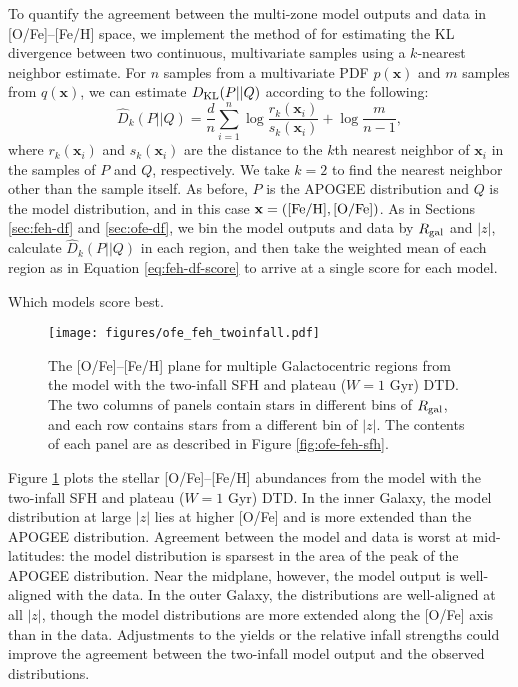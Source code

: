 \documentclass[twocolumn,twocolappendix,linenumbers]{aastex631}
\newcommand{\todo}[1]{{\color{red}#1}}
\begin{document}
To quantify the agreement between the multi-zone model outputs and data in [O/Fe]--[Fe/H] space, we implement the method of \citet{PerezCruz2008-KLTest2D} for estimating the KL divergence between two continuous, multivariate samples using a $k$-nearest neighbor estimate. For $n$ samples from a multivariate PDF $p(\mathbf{x})$ and $m$ samples from $q(\mathbf{x})$, we can estimate $D_{\rm KL}(P||Q)$ according to the following:
\begin{equation}
    \hat D_k(P||Q) = \frac dn \sum_{i=1}^n\log\frac{r_k(\mathbf{x}_i)}{s_k(\mathbf{x}_i)} + \log\frac{m}{n-1},
\end{equation}
where $r_k(\mathbf{x}_i)$ and $s_k(\mathbf{x}_i)$ are the distance to the $k$th nearest neighbor of $\mathbf{x}_i$ in the samples of $P$ and $Q$, respectively. We take $k=2$ to find the nearest neighbor other than the sample itself. As before, $P$ is the APOGEE distribution and $Q$ is the model distribution, and in this case $\mathbf{x}=({\rm [Fe/H]}, {\rm [O/Fe]})$.
As in Sections \ref{sec:feh-df} and \ref{sec:ofe-df}, we bin the model outputs and data by $R_{\rm gal}$ and $|z|$, calculate $\hat D_k(P||Q)$ in each region, and then take the weighted mean of each region as in Equation \ref{eq:feh-df-score} to arrive at a single score for each model.

\todo{Which models score best.}

\begin{figure}
    \centering
    \texttt{[image: figures/ofe\_feh\_twoinfall.pdf]}
    \caption{The [O/Fe]--[Fe/H] plane for multiple Galactocentric regions from the model with the two-infall SFH and plateau ($W=1$ Gyr) DTD. The two columns of panels contain stars in different bins of $R_{\rm gal}$, and each row contains stars from a different bin of $|z|$. The contents of each panel are as described in Figure \ref{fig:ofe-feh-sfh}.}
    \label{fig:ofe-feh-twoinfall}
\end{figure}

Figure \ref{fig:ofe-feh-twoinfall} plots the stellar [O/Fe]--[Fe/H] abundances from the model with the two-infall SFH and plateau ($W=1$ Gyr) DTD. In the inner Galaxy, the model distribution at large $|z|$ lies at higher [O/Fe] and is more extended than the APOGEE distribution. Agreement between the model and data is worst at mid-latitudes: the model distribution is sparsest in the area of the peak of the APOGEE distribution. Near the midplane, however, the model output is well-aligned with the data. In the outer Galaxy, the distributions are well-aligned at all $|z|$, though the model distributions are more extended along the [O/Fe] axis than in the data. Adjustments to the yields or the relative infall strengths could improve the agreement between the two-infall model output and the observed distributions.
\end{document}

